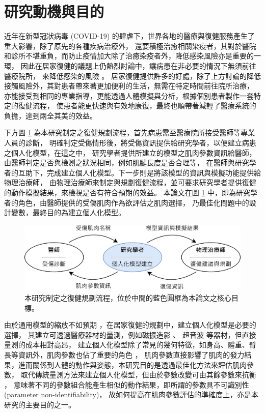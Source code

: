 \section{研究動機與目的}
近年在新型冠狀病毒 (COVID-19) 的肆虐下，世界各地的醫療與復健服務產生了重大影響，除了原先的各種疾病治療外，
還要積極治癒相關染疫者，其對於醫院和診所不堪重負，而防止疫情加大除了治癒染疫者外，降低感染風險亦是重要的一環，
因此在居家復健的議題上仍熱烈討論中，讓病患在非必要的情況下無須前往醫療院所，
來降低感染的風險 \cite{stanev2021real} \cite{guo2023clinical} \cite{falkowski2023study}。
居家復健提供許多的好處，除了上方討論的降低接觸風險外，其對患者帶來著更加便利的生活，無需在特定時間前往院所治療，
亦能接受到相同的專業指導，更能透過人體模擬與分析，根據個別患者製作一套特定的復健流程，
使患者能更快速與有效地康復，最終也順帶著減輕了醫療系統的負擔，達到兩全其美的效益。

下方圖 \ref{ch1_fig_Rehab} 為本研究制定之復健規劃流程，首先病患需至醫療院所接受醫師等專業人員的診斷，
明確判定受傷情形後，將受傷資訊提供給研究學者，以便建立病患之個人化模型，在這之中，
研究學者提供所建立的模型之肌肉參數資訊給醫師，由醫師判定是否與檢測之狀況相同，例如肌腱長度是否合理等，
在醫師與研究學者的互助下，完成建立個人化模型。下一步則是將該模型的資訊與模擬功能提供給物理治療師，
由物理治療師來制定與規劃復健流程，並可要求研究學者提供復健的動作模擬結果，來檢視是否有符合預期的效益。
本論文在圖 \ref{ch1_fig_Rehab} 中，即為研究學者的角色，由醫師提供的受傷肌肉作為欲評估之肌肉選擇，
乃最佳化問題中的設計變數，最終目的為建立個人化模型。

\clearpage

\begin{figure}[!ht]
	\centering
	\includegraphics[width=15cm]{figure/ch1_fig_Rehab.png}
    \caption[復健規劃流程]{本研究制定之復健規劃流程，位於中間的藍色圓框為本論文之核心目標。}
    \label{ch1_fig_Rehab}
\end{figure}

由於通用模型的縮放不如預期 \cite{akhundov2022subject}，在居家復健的規劃中，建立個人化模型是必要的選擇，
其建立可透過醫療器材的量測，例如磁振造影 \cite{da2017feasibility} \cite{dejtiar2020development}、
超音波 \cite{sartori2017subject} \cite{passmore2017application} 等器材，但直接量測的成本相對高昂，
建立個人化模型除了常見的幾何特徵，如身高、體重、臂長等資訊外，肌肉參數也佔了重要的角色 \cite{myers2015probabilistic}，
肌肉參數直接影響了肌肉的發力結果，進而關係到人體的動作與姿態，本研究目的是透過最佳化方法來評估肌肉參數，
取代傳統量測方法來建立個人化模型，但由於參數改變可由其餘參數來抗衡 \cite{bujalski2018monte}，
意味著不同的參數組合能產生相似的動作結果，即所謂的參數具不可識別性 (parameter non-identifiability)，
故如何提高在肌肉參數評估的準確度上，亦是本研究的主要目的之一。

